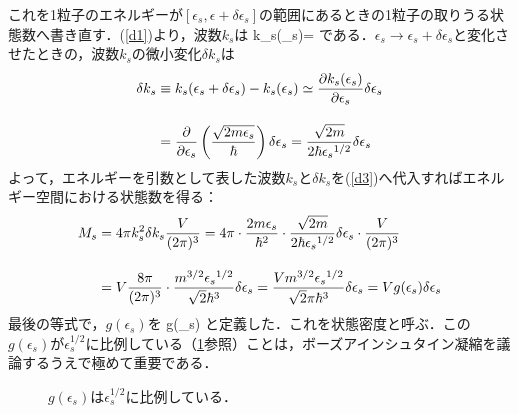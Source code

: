 これを1粒子のエネルギーが$[\epsilon_s,\epsilon+\delta\epsilon_s]$の範囲にあるときの1粒子の取りうる状態数へ書き直す．(\ref{d1})より，波数$k_s$は
\be
k_s(\epsilon_s)=
\ee
である．$\epsilon_s\to\epsilon_s+\delta\epsilon_s$と変化させたときの，波数$k_s$の微小変化$\delta k_s$は
\begin{align}
\delta k_s&\equiv k_s(\epsilon_s+\delta\epsilon_s)-k_s(\epsilon_s)
\simeq\frac{\partial k_s(\epsilon_s)}{\partial\epsilon_s}\delta\epsilon_s\nn[10pt]
&=\frac{\partial}{\partial\epsilon_s}\left(\frac{\sqrt{2m\epsilon_s}}{\hbar}\right)\delta\epsilon_s
=\frac{\sqrt{2m}}{2\hbar{\epsilon_s}^{1/2}}\delta\epsilon_s
\end{align}\label{d4}
よって，エネルギーを引数として表した波数$k_s$と$\delta k_s$を(\ref{d3})へ代入すればエネルギー空間における状態数を得る：
\begin{align}
M_s&=4\pi k_s^2\delta k_s\frac{V}{(2\pi)^3}
=4\pi\cdot\frac{2m\epsilon_s}{\hbar^2}\cdot\frac{\sqrt{2m}}{2\hbar{\epsilon_s}^{1/2}}\delta\epsilon_s\cdot\frac{V}{(2\pi)^3}\nn[10pt]
%
&=V\frac{8\pi}{(2\pi)^3}\cdot\frac{m^{3/2}{\epsilon_s}^{1/2}}{\sqrt{2}\hbar^3}\delta\epsilon_s
=\frac{Vm^{3/2}{\epsilon_s}^{1/2}}{\sqrt{2}\pi\hbar^3}\delta\epsilon_s
=Vg(\epsilon_s)\delta\epsilon_s
\end{align}
最後の等式で，$g(\epsilon_s)$を
\be
g(\epsilon_s)\equiv{}
\ee
と定義した．これを状態密度と呼ぶ．この$g(\epsilon_s)$が$\epsilon_s^{1/2}$に比例している（\ref{ep12}参照）ことは，ボーズアインシュタイン凝縮を議論するうえで極めて重要である．
%
　\begin{figure}[H]
 \centering
{}
  \label{ep12}
  \caption{$g(\epsilon_s)$は$\epsilon_s^{1/2}$に比例している．}
\end{figure}
%















%
